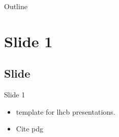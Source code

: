 \begin{frame}{Outline}
  \tableofcontents
\end{frame}
\section{Slide 1}
\subsection{Slide}
\begin{frame}{Slide 1}
  \begin{itemize}
 \item template for lhcb presentations.
   \item Cite pdg ~\cite{PDG2014}
\end{itemize}
\end{frame}